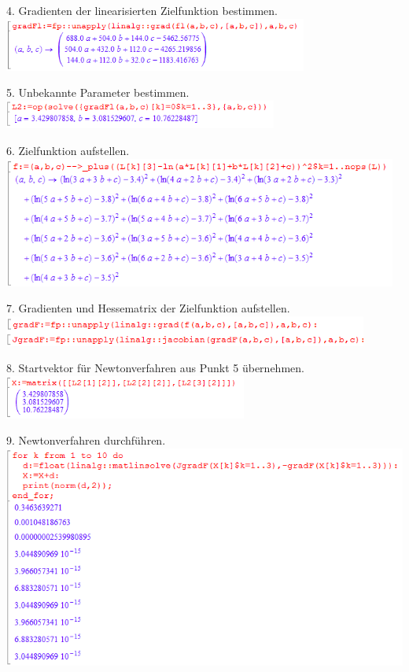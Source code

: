 \documentclass[11pt,final]{scrreprt}
\begin{document}
4. Gradienten der linearisierten Zielfunktion bestimmen.\\

\includegraphics[width=10cm]{images/gaussausgleich/4.png}

5. Unbekannte Parameter bestimmen.\\

\includegraphics[width=9cm]{images/gaussausgleich/5.png}

6. Zielfunktion aufstellen.\\

\includegraphics[width=13cm]{images/gaussausgleich/6.png}

7. Gradienten und Hessematrix der Zielfunktion aufstellen.\\

\includegraphics[width=12cm]{images/gaussausgleich/7.png}

8. Startvektor für Newtonverfahren aus Punkt 5 übernehmen.\\

\includegraphics[width=8cm]{images/gaussausgleich/8.png}

9. Newtonverfahren durchführen.\\

\includegraphics[width=14cm]{images/gaussausgleich/9.png}
\end{document}
